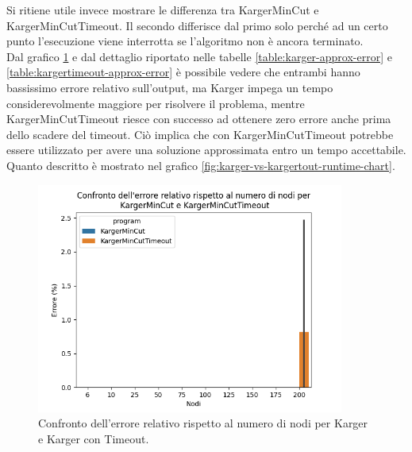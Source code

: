 \noindent Si ritiene utile invece mostrare le differenza tra
KargerMinCut e KargerMinCutTimeout. Il secondo
differisce dal primo solo perché ad un certo punto l'esecuzione viene
interrotta se l'algoritmo non è ancora terminato.\\

\noindent Dal grafico \ref{fig:karger-vs-kargertout-error-chart} e dal
dettaglio riportato nelle tabelle \ref{table:karger-approx-error} e
\ref{table:kargertimeout-approx-error} è possibile vedere che entrambi
hanno bassissimo errore relativo sull'output, ma Karger impega un
tempo considerevolmente maggiore per risolvere il problema, mentre
KargerMinCutTimeout riesce con successo ad ottenere zero errore anche
prima dello scadere del timeout. Ciò implica che con
KargerMinCutTimeout potrebbe essere utilizzato per avere una soluzione
approssimata entro un tempo accettabile. Quanto descritto è mostrato
nel grafico \ref{fig:karger-vs-kargertout-runtime-chart}.

\begin{figure}[H]
    \centering

    \includegraphics[width=0.9\textwidth]{./images/Confronto_dell'errore_relativo_rispetto_al_numero_di_nodi_per__KargerMinCut_e_KargerMinCutTimeout.png}

    \caption{Confronto dell'errore relativo rispetto al numero di nodi per Karger e Karger con Timeout.}
    \label{fig:karger-vs-kargertout-error-chart}
\end{figure}

